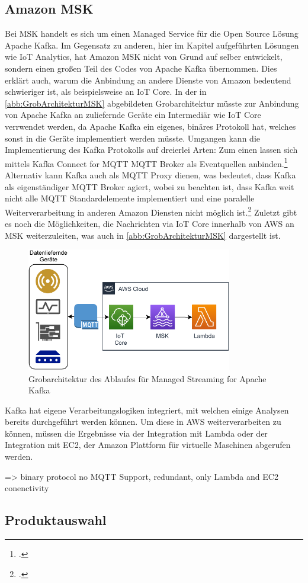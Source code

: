 \subsection{Amazon MSK}
Bei \ac{MSK} handelt es sich um einen Managed Service für die Open Source Lösung Apache Kafka. Im Gegensatz zu anderen, hier im Kapitel aufgeführten Lösungen wie \ac{IoT} Analytics, hat Amazon \ac{MSK} nicht von Grund auf selber entwickelt, sondern einen großen Teil des Codes von Apache Kafka übernommen. Dies erklärt auch, warum die Anbindung an andere Dienste von Amazon bedeutend schwieriger ist, als beispielsweise an \ac{IoT} Core. In der in \autoref{abb:GrobArchitekturMSK} abgebildeten Grobarchitektur müsste zur Anbindung von Apache Kafka an zuliefernde Geräte ein Intermediär wie \ac{IoT} Core verrwendet werden, da Apache Kafka ein eigenes, binäres Protokoll hat, welches sonst in die Geräte implementiert werden müsste.  Umgangen kann die Implementierung des Kafka Protokolls auf dreierlei Arten: Zum einen lassen sich mittels Kafka Connect for \ac{MQTT} \ac{MQTT} Broker als Eventquellen anbinden.\footcite[Vgl.][]{Erber.12.01.2021} Alternativ kann Kafka auch als \ac{MQTT} Proxy dienen, was bedeutet, dass Kafka als eigenständiger MQTT Broker agiert, wobei zu beachten ist, dass Kafka weit nicht alle \ac{MQTT} Standardelemente implementiert und eine paralelle Weiterverarbeitung in anderen Amazon Diensten nicht möglich ist.\footcite[Vgl.][]{Erber.12.01.2021} Zuletzt gibt es noch die Möglichkeiten, die Nachrichten via \ac{IoT} Core innerhalb von \ac{AWS} an \ac{MSK} weiterzuleiten, was auch in \autoref{abb:GrobArchitekturMSK} dargestellt ist.
\begin{figure}[H]
\centering
\includegraphics[width=0.8\textwidth]{graphics/MSK-general.pdf}
\caption{Grobarchitektur des Ablaufes für Managed Streaming for Apache Kafka}
\label{abb:GrobArchitekturMSK}
\end{figure}

Kafka hat eigene Verarbeitungslogiken integriert, mit welchen einige Analysen bereits durchgeführt werden können. Um diese in \ac{AWS} weiterverarbeiten zu können, müssen die Ergebnisse via der Integration mit Lambda oder der Integration mit \ac{EC2}, der Amazon Plattform für virtuelle Maschinen abgerufen werden.

=> binary protocol no \ac{MQTT} Support, redundant, only Lambda and EC2 conenctivity

\subsection{Produktauswahl}